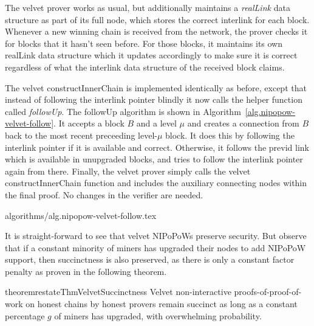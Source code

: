 The velvet prover works as usual, but additionally maintains a
\textit{realLink} data structure as part of its full node, which stores the
correct interlink for each block.  Whenever a new winning chain is received
from the network, the prover checks it for blocks that it hasn't seen before.
For those blocks, it maintains its own realLink data structure which it updates
accordingly to make sure it is correct regardless of what the interlink data
structure of the received block claims.

The velvet constructInnerChain %
is implemented identically as
before, except that instead of following the interlink pointer blindly it now
calls the helper function called \textit{followUp}. The followUp algorithm is
shown in Algorithm~\ref{alg.nipopow-velvet-follow}. It
accepts a block $B$ and a level $\mu$ and creates a connection from $B$ back to
the most recent preceeding level-$\mu$ block. It does this by following the
interlink pointer if it is available and correct. Otherwise, it follows the
previd link which is available in unupgraded blocks, and tries to follow the
interlink pointer again from there. Finally, the velvet prover %
simply calls the velvet
constructInnerChain %
function and includes the auxiliary connecting nodes
within the final proof. No changes in the verifier are needed.

{algorithms/alg.nipopow-velvet-follow.tex}

It is straight-forward to see that velvet NIPoPoWs preserve security. But
observe that if a constant minority of miners has upgraded their nodes to add
NIPoPoW support, then succinctness is also preserved, as there is only a
constant factor penalty as proven in the following theorem.

\begin{restatable}{theorem}{restateThmVelvetSuccinctness}
    Velvet non-interactive proofs-of-proof-of-work on honest chains by honest
    provers remain succinct as long as a constant percentage $g$ of miners has
    upgraded, with overwhelming probability.
\end{restatable}

